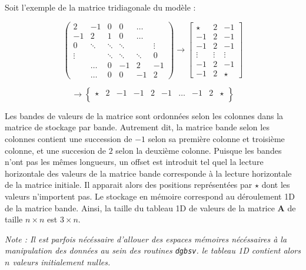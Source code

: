 \documentclass[12pt]{report}
\newcommand{\A}{\mathbf{A}}
\begin{document}
Soit l'exemple de la matrice tridiagonale du modèle :

\begin{equation}
\begin{pmatrix}
2 & -1& 0 & 0 & \hdots&  \\
-1 & 2 &  1 & 0 & \hdots  &  \\
0&  \ddots&\ddots &\ddots && \vdots\\
\vdots& & \ddots&\ddots &\ddots &0 \\
&\hdots &0 & -1&2 & -1 \\
&\hdots &0 &0 &-1 & 2
\end{pmatrix} \longrightarrow 
\begin{bmatrix}
\star & 2 & -1   \\
-1 & 2 &  -1 \\
-1 &  2 &-1  \\
\vdots&\vdots &\vdots\\
-1 & 2 & -1 \\
-1 & 2 & \star 
\end{bmatrix}
\end{equation}

\begin{equation*}
\longrightarrow 
\begin{Bmatrix}
\star & 2 & -1 &  -1 & 2 &  -1   & \hdots & -1  & 2 & \star \\
\end{Bmatrix}
\end{equation*}


Les bandes de valeurs de la matrice sont ordonnées selon les colonnes dans la matrice de stockage par bande. Autrement dit, la matrice bande selon les colonnes contient une succession de $-1$ selon sa première colonne et troisième colonne, et une succesion de $2$ selon la deuxième colonne. Puisque les bandes n'ont pas les mêmes longueurs, un offset est introduit tel quel la lecture horizontale des valeurs de la matrice bande corresponde à la lecture horizontale de la matrice initiale. Il apparait alors des positions représentées par $\star$ dont les valeurs n'importent pas. Le stockage en mémoire correspond au déroulement 1D de la matrice bande. Ainsi, la taille du tableau 1D de valeurs de la matrice $\A$ de taille $n\times n$ est $3 \times n$. 


\textit{Note : Il est parfois nécéssaire  d'allouer des espaces mémoires nécéssaires à la manipulation des données au sein des routines \texttt{dgbsv}. le tableau 1D contient alors $n$ valeurs initialement nulles.}
\end{document}

